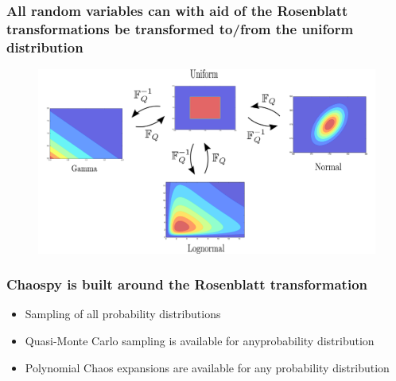 \documentclass[handout]{beamer}
\begin{document}
 \begin{frame}
 \frametitle{All random variables can with aid of the Rosenblatt transformations be transformed to/from the uniform distribution}
 \begin{figure}
 \includegraphics[width = \textwidth]{distributions.png}
 \end{figure}

 \end{frame}

 \begin{frame}
 \frametitle{Chaospy is built around the Rosenblatt transformation }

\begin{itemize}[<+->]
\item Sampling of all probability distributions
\item Quasi-Monte Carlo sampling is available for anyprobability distribution
\item Polynomial Chaos expansions are available for any probability distribution
\end{itemize}

 \end{frame}
\end{document}
